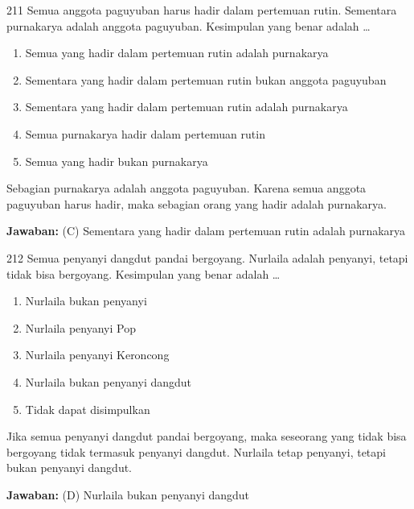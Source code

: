 \documentclass[11pt]{article}
\newenvironment{pil}{\begin{enumerate}[label=(\Alph*),leftmargin=*,itemsep=1pt,topsep=3pt]}{\end{enumerate}}
\newcommand{\jw}[1]{\par\smallskip\begin{jawbox}\textbf{Jawaban:} #1\end{jawbox}}
\begin{document}
\begin{soalbox}{2}{11}
Semua anggota paguyuban harus hadir dalam pertemuan rutin. Sementara purnakarya adalah anggota paguyuban. Kesimpulan yang benar adalah \ldots
\begin{pil}\item Semua yang hadir dalam pertemuan rutin adalah purnakarya \item Sementara yang hadir dalam pertemuan rutin bukan anggota paguyuban \item Sementara yang hadir dalam pertemuan rutin adalah purnakarya \item Semua purnakarya hadir dalam pertemuan rutin \item Semua yang hadir bukan purnakarya\end{pil}
\end{soalbox}
\begin{pembox}
Sebagian purnakarya adalah anggota paguyuban. Karena semua anggota paguyuban harus hadir, maka sebagian orang yang hadir adalah purnakarya.
\jw{(C) Sementara yang hadir dalam pertemuan rutin adalah purnakarya}
\end{pembox}

\begin{soalbox}{2}{12}
Semua penyanyi dangdut pandai bergoyang. Nurlaila adalah penyanyi, tetapi tidak bisa bergoyang. Kesimpulan yang benar adalah \ldots
\begin{pil}\item Nurlaila bukan penyanyi \item Nurlaila penyanyi Pop \item Nurlaila penyanyi Keroncong \item Nurlaila bukan penyanyi dangdut \item Tidak dapat disimpulkan\end{pil}
\end{soalbox}
\begin{pembox}
Jika semua penyanyi dangdut pandai bergoyang, maka seseorang yang tidak bisa bergoyang tidak termasuk penyanyi dangdut. Nurlaila tetap penyanyi, tetapi bukan penyanyi dangdut.
\jw{(D) Nurlaila bukan penyanyi dangdut}
\end{pembox}
\end{document}
